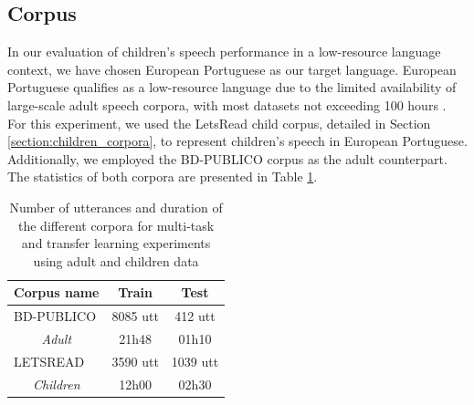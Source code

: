 \subsection{Corpus}
\label{sec:corpus}
In our evaluation of children's speech performance in a low-resource language context, we have chosen European Portuguese as our target language. European Portuguese qualifies as a low-resource language due to the limited availability of large-scale adult speech corpora, with most datasets not exceeding 100 hours \cite{tribus}. For this experiment, we used the LetsRead child corpus, detailed in Section \ref{section:children_corpora}, to represent children's speech in European Portuguese. Additionally, we employed the BD-PUBLICO corpus as the adult counterpart. The statistics of both corpora are presented in Table \ref{tab:statistics_exp1}.

\begin{table}[h]
\begin{center}
\begin{tabular}{lcc}
\hline
Corpus name      & Train & Test  \\ \hline
\multicolumn{1}{l}{BD-PUBLICO}             & 8085 utt  & 412 utt  \\ 
\multicolumn{1}{c}{\textit{Adult}}              & 21h48 & 01h10 \\\hline
\multicolumn{1}{l}{LETSREAD}     & 3590 utt & 1039 utt \\ 
\multicolumn{1}{c}{\textit{Children}}     & 12h00 & 02h30 \\  \hline
\end{tabular}
\caption{Number of utterances and duration of the different corpora for multi-task and transfer learning experiments using adult and children data}
\label{tab:statistics_exp1}
\end{center}
\end{table}

